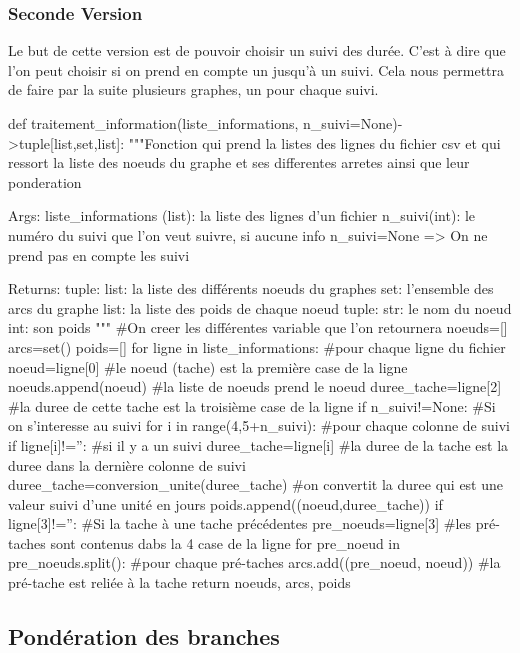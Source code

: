 \documentclass{article}
\begin{document}
\subsubsection{Seconde Version}
Le but de cette version est de pouvoir choisir un suivi des durée. C'est à dire que l'on peut choisir si on prend en compte un jusqu'à un suivi. Cela nous permettra de faire par la suite plusieurs graphes, un pour chaque suivi.

\begin{python}
    def traitement_information(liste_informations, n_suivi=None)->tuple[list,set,list]:
    """Fonction qui prend la listes des lignes du fichier csv et qui ressort la liste des noeuds du graphe et ses differentes arretes ainsi que leur ponderation

    Args:
        liste_informations (list): la liste des lignes d'un fichier
        n_suivi(int): le numéro du suivi que l'on veut suivre, si aucune info n_suivi=None => On ne prend pas en compte les suivi

    Returns:
        tuple: 
            list: la liste des différents noeuds du graphes 
            set: l'ensemble des arcs du graphe
            list: la liste des poids de chaque noeud
                tuple: 
                    str: le nom du noeud
                    int: son poids
    """
    #On creer les différentes variable que l'on retournera
    noeuds=[]
    arcs=set()
    poids=[]
    for ligne in liste_informations: #pour chaque ligne du fichier
        noeud=ligne[0] #le noeud (tache) est la première case de la ligne
        noeuds.append(noeud) #la liste de noeuds prend le noeud
        duree_tache=ligne[2] #la duree de cette tache est la troisième case de la ligne
        if n_suivi!=None: #Si on s'interesse au suivi
            for i in range(4,5+n_suivi): #pour chaque colonne de suivi
                if ligne[i]!='': #si il y a un suivi
                    duree_tache=ligne[i] #la duree de la tache est la duree dans la dernière colonne de suivi
        duree_tache=conversion_unite(duree_tache) #on convertit la duree qui est une valeur suivi d'une unité en jours
        poids.append((noeud,duree_tache)) 
        if ligne[3]!='': #Si la tache à une tache précédentes 
            pre_noeuds=ligne[3] #les pré-taches sont contenus dabs la 4 case de la ligne
            for pre_noeud in pre_noeuds.split(): #pour chaque pré-taches
                arcs.add((pre_noeud, noeud)) #la pré-tache est reliée à la tache
    return noeuds, arcs, poids
\end{python}

\subsection{Pondération des branches}
\end{document}
